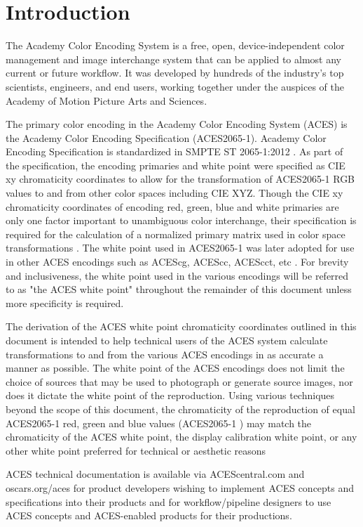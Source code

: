 \unnumberedformat	    %
\chapter{Introduction} 	%

The Academy Color Encoding System is a free, open, device-independent color management and image interchange system that can be applied to almost any current or future workflow. It was developed by hundreds of the industry's top scientists, engineers, and end users, working together under the auspices of the Academy of Motion Picture Arts and Sciences.

The primary color encoding in the Academy Color Encoding System (ACES) is the Academy Color Encoding Specification (ACES2065-1).  Academy Color Encoding Specification is standardized in SMPTE ST 2065-1:2012 \cite{SMPTE20651}.  As part of the specification, the encoding primaries and white point were specified as CIE xy chromaticity coordinates to allow for the transformation of ACES2065-1 RGB values to and from other color spaces including CIE XYZ.  Though the CIE xy chromaticity coordinates of encoding red, green, blue and white primaries are only one factor important to unambiguous color interchange\cite{giorgianni}, their specification is required for the calculation of a normalized primary matrix used in color space transformations \cite{smpteRP1997}. The white point used in ACES2065-1 was later adopted for use in other ACES encodings such as ACEScg, ACEScc, ACEScct, etc \cite{ACEScg,ACEScc,ACEScct}. For brevity and inclusiveness, the white point used in the various encodings will be referred to as "the ACES white point" throughout the remainder of this document unless more specificity is required.

The derivation of the ACES white point chromaticity coordinates outlined in this document is intended to help technical users of the ACES system calculate transformations to and from the various ACES encodings in as accurate a manner as possible.  The white point of the ACES encodings does not limit the choice of sources that may be used to photograph or generate source images, nor does it dictate the white point of the reproduction. Using various techniques beyond the scope of this document, the chromaticity of the reproduction of equal ACES2065-1 red, green and blue values (ACES2065-1 \rgbequal) may match the chromaticity of the ACES white point, the display calibration white point, or any other white point preferred for technical or aesthetic reasons

ACES technical documentation is available via ACEScentral.com and oscars.org/aces for product developers wishing to implement ACES concepts and specifications into their products and for workflow/pipeline designers to use ACES concepts and ACES-enabled products for their productions.